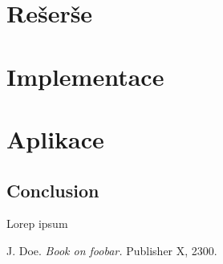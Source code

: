 \documentclass{ctuthesis}
\begin{document}
\maketitle



\part{Rešerše}

\part{Implementace}

\part{Aplikace}

\chapter{Conclusion}

Lorep ipsum \cite{doe}

\begin{thebibliography}{1}

     J. Doe. \emph{Book on foobar.} Publisher X, 2300.

\end{thebibliography}
\end{document}

